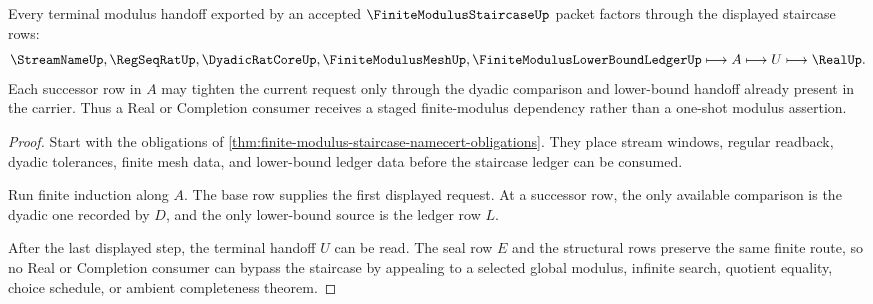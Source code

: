 \begin{theorem}
\label{thm:finite-modulus-staircase-monotone-refinement}
Every terminal modulus handoff exported by an accepted $\FiniteModulusStaircaseUp$ packet factors through the displayed staircase rows:
$$
\StreamNameUp,\RegSeqRatUp,\DyadicRatCoreUp,\FiniteModulusMeshUp,\FiniteModulusLowerBoundLedgerUp
\longmapsto A \longmapsto U \longmapsto \RealUp .
$$
Each successor row in $A$ may tighten the current request only through the dyadic comparison and lower-bound handoff already present in the carrier. Thus a Real or Completion consumer receives a staged finite-modulus dependency rather than a one-shot modulus assertion.
\end{theorem}
\begin{proof}
Start with the obligations of \autoref{thm:finite-modulus-staircase-namecert-obligations}. They place stream windows, regular readback, dyadic tolerances, finite mesh data, and lower-bound ledger data before the staircase ledger can be consumed.

Run finite induction along $A$. The base row supplies the first displayed request. At a successor row, the only available comparison is the dyadic one recorded by $D$, and the only lower-bound source is the ledger row $L$.

After the last displayed step, the terminal handoff $U$ can be read. The seal row $E$ and the structural rows preserve the same finite route, so no Real or Completion consumer can bypass the staircase by appealing to a selected global modulus, infinite search, quotient equality, choice schedule, or ambient completeness theorem.
\end{proof}



